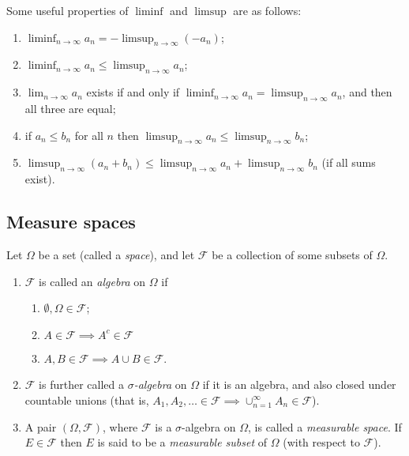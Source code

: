 \documentclass{maths}
\newcommand{\alg}{\mathcal{F}}
\begin{document}
\begin{prop}
    Some useful properties of $\liminf$ and $\limsup$ are as follows:
    \begin{enumerate}
        \item $\liminf_{n\to\infty} a_n = -\limsup_{n\to\infty} (-a_n)$;
        \item $\liminf_{n\to\infty} a_n \leqslant \limsup_{n\to\infty} a_n$;
        \item $\lim_{n\to\infty} a_n$ exists if and only if $\liminf_{n\to\infty} a_n = \limsup_{n\to\infty} a_n$, and then all three are equal;
        \item if $a_n\leqslant b_n$ for all $n$ then $\limsup_{n\to\infty} a_n\leqslant \limsup_{n\to\infty} b_n$;
        \item $\limsup_{n\to\infty} (a_n+b_n)\leqslant\limsup_{n\to\infty} a_n+\limsup_{n\to\infty} b_n$ (if all sums exist).
    \end{enumerate}
\end{prop}

\subsection{Measure spaces}

\begin{defn}
    Let $\Omega$ be a set (called a \emph{space}), and let $\alg$ be a collection of some subsets of $\Omega$.
    \begin{enumerate}
        \item $\alg$ is called an \emph{algebra} on $\Omega$ if
        \begin{enumerate}
            \item $\emptyset,\Omega\in\alg$;
            \item $A\in\alg\implies A^c\in\alg$
            \item $A,B\in\alg\implies A\cup B\in\alg$.
        \end{enumerate}
        \item $\alg$ is further called a \emph{$\sigma$-algebra} on $\Omega$ if it is an algebra, and also closed under countable unions (that is, $A_1,A_2,\ldots\in\alg\implies\cup_{n=1}^{\infty}A_n\in\alg$).
        \item A pair $(\Omega,\alg)$, where $\alg$ is a $\sigma$-algebra on $\Omega$, is called a \emph{measurable space}.
        If $E\in\alg$ then $E$ is said to be a \emph{measurable subset} of $\Omega$ (with respect to $\alg$).
    \end{enumerate}
\end{defn}
\end{document}
